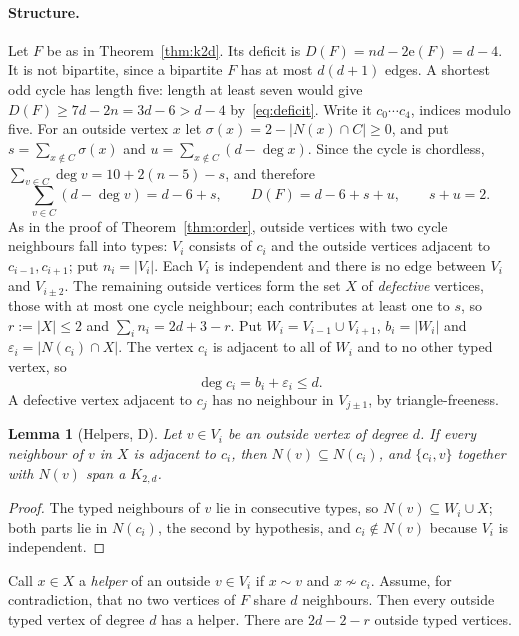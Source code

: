 \documentclass[11pt]{article}
\newtheorem{lemma}[theorem]{Lemma}
\theoremstyle{remark}
\newcommand{\e}{\mathrm{e}}
\begin{document}
\paragraph{Structure.} Let $F$ be as in Theorem~\ref{thm:k2d}. Its deficit is $D(F)=nd-2\e(F)=d-4$. It is not bipartite, since a bipartite $F$ has at most $d(d+1)$ edges. A shortest odd cycle has length five: length at least seven would give $D(F)\ge7d-2n=3d-6>d-4$ by~\eqref{eq:deficit}. Write it $c_0\cdots c_4$, indices modulo five. For an outside vertex $x$ let $\sigma(x)=2-|N(x)\cap C|\ge0$, and put $s=\sum_{x\notin C}\sigma(x)$ and $u=\sum_{x\notin C}(d-\deg x)$. Since the cycle is chordless, $\sum_{v\in C}\deg v=10+2(n-5)-s$, and therefore
\begin{equation}\label{eq:ab}
\sum_{v\in C}(d-\deg v)=d-6+s,\qquad D(F)=d-6+s+u,\qquad s+u=2 .
\end{equation}
As in the proof of Theorem~\ref{thm:order}, outside vertices with two cycle neighbours fall into types: $V_i$ consists of $c_i$ and the outside vertices adjacent to $c_{i-1},c_{i+1}$; put $n_i=|V_i|$. Each $V_i$ is independent and there is no edge between $V_i$ and $V_{i\pm2}$. The remaining outside vertices form the set $X$ of \emph{defective} vertices, those with at most one cycle neighbour; each contributes at least one to $s$, so $r:=|X|\le2$ and $\sum_in_i=2d+3-r$. Put $W_i=V_{i-1}\cup V_{i+1}$, $b_i=|W_i|$ and $\varepsilon_i=|N(c_i)\cap X|$. The vertex $c_i$ is adjacent to all of $W_i$ and to no other typed vertex, so
\begin{equation}\label{eq:ci}
\deg c_i=b_i+\varepsilon_i\le d .
\end{equation}
A defective vertex adjacent to $c_j$ has no neighbour in $V_{j\pm1}$, by triangle-freeness.

\begin{lemma}[Helpers, D]\label{lem:helper}
Let $v\in V_i$ be an outside vertex of degree $d$. If every neighbour of $v$ in $X$ is adjacent to $c_i$, then $N(v)\subseteq N(c_i)$, and $\{c_i,v\}$ together with $N(v)$ span a $K_{2,d}$.
\end{lemma}
\begin{proof}
The typed neighbours of $v$ lie in consecutive types, so $N(v)\subseteq W_i\cup X$; both parts lie in $N(c_i)$, the second by hypothesis, and $c_i\notin N(v)$ because $V_i$ is independent.
\end{proof}

Call $x\in X$ a \emph{helper} of an outside $v\in V_i$ if $x\sim v$ and $x\not\sim c_i$. Assume, for contradiction, that no two vertices of $F$ share $d$ neighbours. Then every outside typed vertex of degree $d$ has a helper. There are $2d-2-r$ outside typed vertices.
\end{document}

